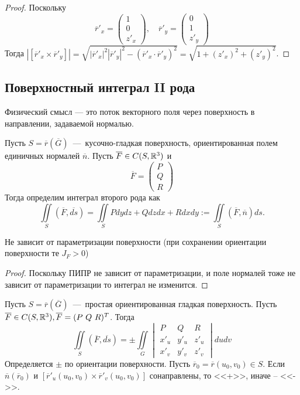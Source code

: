 \begin{proof}
    Поскольку \[
    \overline{r}'_x = \begin{pmatrix}
        1 \\ 0 \\ z'_x
    \end{pmatrix}, \quad \overline{r}'_y = \begin{pmatrix}
        0 \\ 1 \\ z'_y
    \end{pmatrix}
    \]
    Тогда $|[\overline{r}'_x \times \overline{r}'_y]| = \sqrt{|\overline{r}'_x|^2|\overline{r}'_y|^2 - (\overline{r}'_x\cdot \overline{r}'_y)^2} = \sqrt{1 + (z'_x)^2 + (z'_y)^2}$.
\end{proof}

\subsection{Поверхностный интеграл II рода}
Физический смысл --- это поток векторного поля через поверхность в направлении, задаваемой нормалью.
\begin{definition}
    Пусть $S = \overline{r}(\overline{G})$~---~кусочно-гладкая поверхность, ориентированная полем единичных нормалей $\overline{n}$. Пусть $\overline{F} \in C(S, \mathbb{R}^3)$ и \[
    \overline{F} = 
    \begin{pmatrix}
        P \\ Q \\ R
    \end{pmatrix}
    \]
    Тогда определим интеграл второго рода как \[
    \iint\limits_S (\overline{F}, \overline{ds}) = \iint\limits_S Pdydz + Qdzdx + Rdxdy := \iint\limits_S (\overline{F}, \overline{n})ds.
    \]
\end{definition}
\begin{lemma}
    Не зависит от параметризации поверхности (при сохранении ориентации поверхности те $J_F > 0$)
\end{lemma}
\begin{proof}   
    Поскольку ПИПР не зависит от параметризации, и поле нормалей тоже не зависит от параметризации то интеграл не изменится.
\end{proof}
\begin{lemma}
    Пусть $S = \overline{r}(\overline{G})$~---~простая ориентированная гладкая поверхность. Пусть $\overline{F} \in C(S, \mathbb{R}^3), \overline{F} = (P \ Q \ R)^T$. Тогда \[\iint\limits_S (\overline{F}, \overline{ds}) = \pm \iint\limits_G \begin{vmatrix}
        P & Q & R \\ x'_u & y'_u & z'_u \\ x'_v & y'_v & z'_v
    \end{vmatrix} dudv
    \]
    Определяется $\pm$ по ориентации поверхности. Пусть $\overline{r}_0 = \overline{r}(u_0, v_0) \in S$. Если $\overline{n}(\overline{r}_0)$ и $[\overline{r}'_u(u_0, v_0) \times \overline{r}'_v(u_0, v_0)]$ сонаправлены, то <<+>>, иначе -- <<->>.
\end{lemma}
